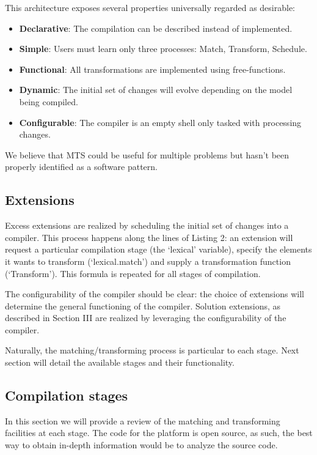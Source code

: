\documentclass[conference]{IEEEtran}
\begin{document}
This architecture exposes several properties universally regarded as desirable:

\begin{itemize}
   \item \textbf{Declarative}: The compilation can be described instead of implemented.
   \item \textbf{Simple}: Users must learn only three processes: Match, Transform, Schedule.
   \item \textbf{Functional}: All transformations are implemented using free-functions.
   \item \textbf{Dynamic}: The initial set of changes will evolve depending on the model being compiled.
   \item \textbf{Configurable}: The compiler is an empty shell only tasked with processing changes.
 \end{itemize}

We believe that MTS could be useful for multiple problems but hasn't been properly identified as a software pattern. 

\subsection{Extensions}

Excess extensions are realized by scheduling the initial set of changes into a compiler. This process happens along the lines of Listing 2: an extension will request a particular compilation stage (the `lexical' variable), 
specify the elements it wants to transform (`lexical.match') and supply a transformation function (`Transform'). This formula is repeated for all stages of compilation.

The configurability of the compiler should be clear: the choice of extensions will determine the general functioning of the compiler. Solution extensions, as described in Section III are realized by leveraging the configurability of the compiler.

Naturally, the matching/transforming process is particular to each stage. Next section will detail the available stages and their functionality.

\subsection{Compilation stages}

In this section we will provide a review of the matching and transforming facilities at each stage. The code for the platform is open source, as such, the best way to obtain in-depth information would be to analyze the source code.
\end{document}
